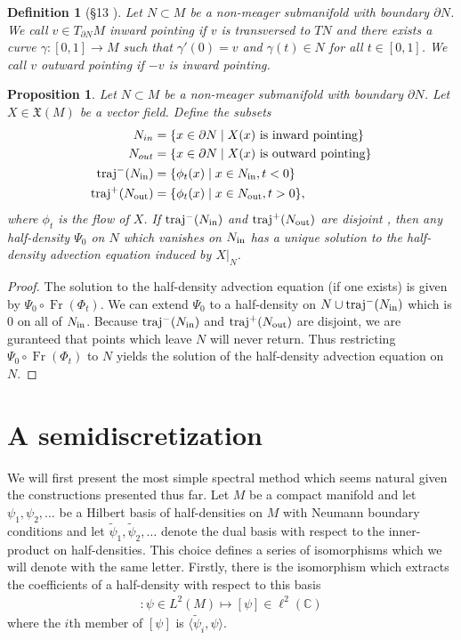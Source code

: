\documentclass[12pt]{amsart}
\newtheorem{prop}{Proposition}
\newtheorem{defn}{Definition}
\DeclareMathOperator{\Fr}{Fr}
\begin{document}
\begin{defn}[\S 13 \cite{Lee2006}]
  Let $N \subset M$ be a non-meager submanifold with boundary $\partial N$.
  We call $v \in T_{\partial N}M$ \emph{inward pointing} if $v$ is transversed to $TN$ and there exists a curve $\gamma: [0,1] \to M$ such that $\gamma'(0) = v$ and $\gamma(t) \in N$ for all $t \in [0,1]$.
We call $v$ \emph{outward pointing} if $-v$ is inward pointing.
\end{defn}

\begin{prop}
  Let $N \subset M$ be a non-meager submanifold with boundary $\partial N$.
  Let $X \in \mathfrak{X}(M)$ be a vector field.
  Define the subsets
  \begin{align*}
    N_{in} &= \{ x \in \partial N \mid X(x) \text{ is inward pointing} \} \\
    N_{out}&= \{ x \in \partial N \mid X(x) \text{ is outward pointing} \} \\
    {\rm traj}^-(N_{\rm in}) &= \{ \phi_{t}(x) \mid x \in N_{\rm in}, t < 0 \} \\
    {\rm traj}^+(N_{\rm out}) &= \{ \phi_{t}(x) \mid x \in N_{\rm out}, t > 0 \},
  \end{align*}
  where $\phi_t$ is the flow of $X$.
  If ${\rm traj}^-(N_{\rm in})$ and ${\rm traj}^+(N_{\rm out})$ are disjoint , then any half-density $\Psi_0$ on $N$ which vanishes on $N_{\rm in}$ has a unique solution to the half-density advection equation induced by $X|_{N}$.
\end{prop}
\begin{proof}
  The solution to the half-density advection equation (if one exists) is given by $\Psi_0 \circ \Fr( \Phi_t)$.  We can extend $\Psi_0$ to a half-density on $N \cup {\rm traj}^-(N_{\rm in})$ which is $0$ on all of $N_{\rm in}$.
  Because ${\rm traj}^-(N_{\rm in})$ and ${\rm traj}^+(N_{\rm out})$ are disjoint, we are guranteed that points which leave $N$ will never return.
  Thus restricting $\Psi_0 \circ \Fr( \Phi_t)$ to $N$ yields the solution of the half-density advection equation on $N$.
\end{proof}


\section{A semidiscretization}
\label{sec:semi_discretization}

We will first present the most simple spectral method
which seems natural given the constructions presented thus far.
Let $M$ be a compact manifold and let
$\psi_1,\psi_2,\dots$ be a Hilbert basis of half-densities
on $M$ with Neumann boundary conditions
and let $\tilde{\psi}_1,\tilde{\psi}_2,\dots$ denote the dual basis
with respect to the inner-product on half-densities.
This choice defines a series of isomorphisms which we will
denote with the same letter.
Firstly, there is the isomorphism which extracts the coefficients of 
a half-density with respect to this basis
\begin{align*}
  [\cdot ] : \psi \in L^2(M) \mapsto [\psi] \in \ell^2( \mathbb{C})
\end{align*}
where the $i$th member of $[\psi]$ is $\langle \tilde{\psi}_i , \psi \rangle$.
\end{document}

